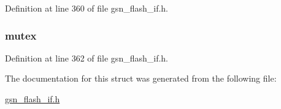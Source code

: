 Definition at line 360 of file gsn\_\-flash\_\-if.h.

\hypertarget{a00079_a8586d6383a0c3353fb572f07d6ef7d87}{
\subsubsection[{mutex}]{ {\bf mutex}}}
\label{a00079_a8586d6383a0c3353fb572f07d6ef7d87}


Definition at line 362 of file gsn\_\-flash\_\-if.h.



The documentation for this struct was generated from the following file:\begin{DoxyCompactItemize}
\item 
\hyperlink{a00501}{gsn\_\-flash\_\-if.h}\end{DoxyCompactItemize}
